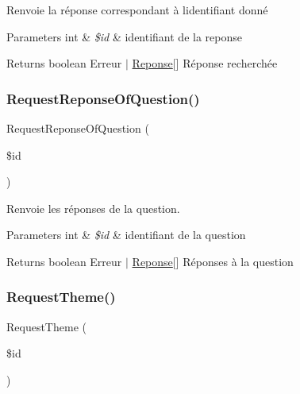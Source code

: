 Renvoie la réponse correspondant à l\textquotesingle{}identifiant donné 


\begin{DoxyParams}[1]{Parameters}
int & {\em \$id} & identifiant de la reponse\\
\hline
\end{DoxyParams}
\begin{DoxyReturn}{Returns}
boolean Erreur $\vert$ \mbox{\hyperlink{class_reponse}{Reponse}}\mbox{[}\mbox{]} Réponse recherchée 
\end{DoxyReturn}
\mbox{\label{class_interface_b_d_d_aeb7156b09f5a9ee1a472bdaf3ef603b3}} 
\subsubsection{\texorpdfstring{Request\+Reponse\+Of\+Question()}{RequestReponseOfQuestion()}}
{\footnotesize\ttfamily Request\+Reponse\+Of\+Question (\begin{DoxyParamCaption}\item[{}]{\$id }\end{DoxyParamCaption})}



Renvoie les réponses de la question. 


\begin{DoxyParams}[1]{Parameters}
int & {\em \$id} & identifiant de la question\\
\hline
\end{DoxyParams}
\begin{DoxyReturn}{Returns}
boolean Erreur $\vert$ \mbox{\hyperlink{class_reponse}{Reponse}}\mbox{[}\mbox{]} Réponses à la question 
\end{DoxyReturn}
\mbox{\label{class_interface_b_d_d_a03ff86215559d5aa319c416aaa5a3f46}} 
\subsubsection{\texorpdfstring{Request\+Theme()}{RequestTheme()}}
{\footnotesize\ttfamily Request\+Theme (\begin{DoxyParamCaption}\item[{}]{\$id }\end{DoxyParamCaption})}



